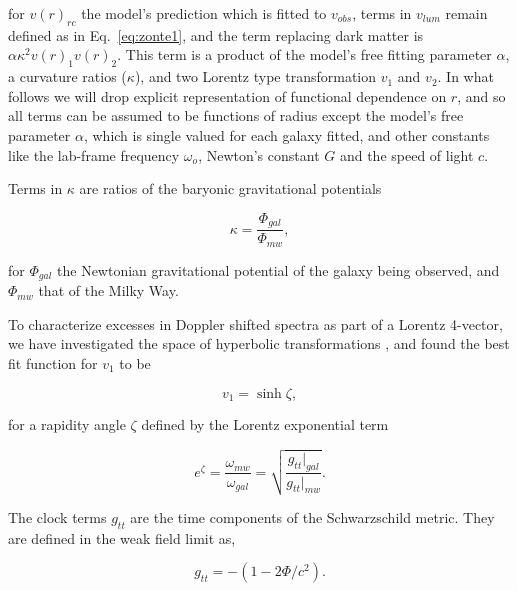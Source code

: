 \documentclass[reprint,%
 amsmath,amssymb,
 aps,
]{revtex4-1}
\begin{document}
for $v(r)_{rc}$ the model's prediction which is fitted to $v_{obs}$, terms in $v_{lum}$ remain defined as in 
  Eq.~\ref{eq:zonte1}, and the   term   replacing  dark matter is  $\alpha \kappa^2 v(r)_{1} v(r)_{2}$. This term is a product of the model's free fitting parameter $\alpha$, a curvature ratios ($\kappa$),  and two Lorentz type transformation $v_1$ and $v_2$. 
  In what follows we will drop explicit representation of functional dependence on $r$, and so all   terms  can be assumed to  be functions of radius except the model's free parameter $\alpha$,  which is single valued for each galaxy fitted, and other constants like the lab-frame frequency $\omega_o$, Newton's constant $G$ and the speed of light $c$.  
  
  Terms in 
$\kappa$  are   ratios of the baryonic gravitational potentials 

 \begin{equation}
\kappa=\frac{\Phi_{gal}}{\Phi_{mw}}, 
\label{eq:kappa2}  
\end{equation}  

 for $\Phi_{gal}$ the    Newtonian gravitational potential of the galaxy being observed, and $\Phi_{mw}$ that of  the Milky Way.  
 
 
 To characterize    excesses in Doppler shifted spectra
  as     part of  a Lorentz 4-vector, we have investigated the space of hyperbolic transformations  \cite{Cisneros:2013vha,Cisneros:2014fea,Cisneros2015,Cisn2016}, and found the best fit function for $v_1$ to be

 
 
   \begin{equation}
       v_1 = \sinh \zeta, 
       \label{eq:hyperbolica}
   \end{equation}
 
 for a rapidity angle $\zeta$  defined by the    Lorentz exponential  term  
  
   
     \begin{equation}
     e^{\zeta}=  \frac{\omega_{mw}}{\omega_{gal}}  =\sqrt{\frac{g_{tt}|_{gal}}{g_{tt}|_{mw}}}.
      \label{eq:gravRS}
    \end{equation}
    
 The clock terms $g_{tt}$  are the time components of the  Schwarzschild metric.  They are defined in the   weak field limit  \cite{Hartle} as, 
 
  \begin{equation}
      g_{tt}= -( 1 - 2\Phi/ c^2).
      \label{clocktime}
  \end{equation} 
  
\end{document}
